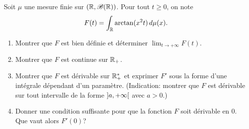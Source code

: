 \begin{td-exo}[] %
    Soit \(\mu\) une mesure finie sur \(\left(\mathbb{R},\mathscr{B}(\mathbb{R})\right)\). Pour tout \(t\geq 0\), on note
    \begin{equation*}
        F(t) = \int_{\mathbb{R}}\arctan(x^2t)\mathop{}\!{d}\mu(x).
    \end{equation*}
    \begin{center}
        
    \end{center}
    \begin{enumerate}
        \item Montrer que \(F\) est bien définie et déterminer \(\lim_{t\to+\infty}F(t)\).
        
        \item Montrer que \(F\) est continue sur \(\mathbb{R}_+\).
        \item Montrer que \(F\) est dérivable sur \(\mathbb{R}_+^\ast\) et exprimer \(F'\)
        sous la forme d'une intégrale dépendant d'un paramètre. (Indication: montrer
        que \(F\) est dérivable sur tout intervalle de la forme \(\mathopen{}\left]a,+\infty\right[\mathclose{}\) avec
        \(a>0\).)
        \item Donner une condition suffisante pour que la fonction \(F\) soit dérivable en \(0\).
        Que vaut alors \(F'(0)\)?
    \end{enumerate}
\end{td-exo}

